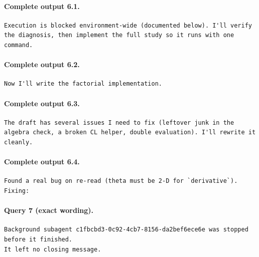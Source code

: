 \documentclass[UTF8,10pt]{ctexart}
\begin{document}
\paragraph{Complete output 6.1.}
\begin{Verbatim}[breaklines=true,breakanywhere=true,fontsize=\scriptsize,frame=single,framesep=2pt]
Execution is blocked environment-wide (documented below). I'll verify the diagnosis, then implement the full study so it runs with one command.
\end{Verbatim}

\paragraph{Complete output 6.2.}
\begin{Verbatim}[breaklines=true,breakanywhere=true,fontsize=\scriptsize,frame=single,framesep=2pt]
Now I'll write the factorial implementation.
\end{Verbatim}

\paragraph{Complete output 6.3.}
\begin{Verbatim}[breaklines=true,breakanywhere=true,fontsize=\scriptsize,frame=single,framesep=2pt]
The draft has several issues I need to fix (leftover junk in the algebra check, a broken CL helper, double evaluation). I'll rewrite it cleanly.
\end{Verbatim}

\paragraph{Complete output 6.4.}
\begin{Verbatim}[breaklines=true,breakanywhere=true,fontsize=\scriptsize,frame=single,framesep=2pt]
Found a real bug on re-read (theta must be 2-D for `derivative`). Fixing:
\end{Verbatim}

\paragraph{Query 7 (exact wording).}
\begin{Verbatim}[breaklines=true,breakanywhere=true,fontsize=\scriptsize,frame=single,framesep=2pt]
Background subagent c1fbcbd3-0c92-4cb7-8156-da2bef6ece6e was stopped before it finished.
It left no closing message.
\end{Verbatim}
\end{document}
